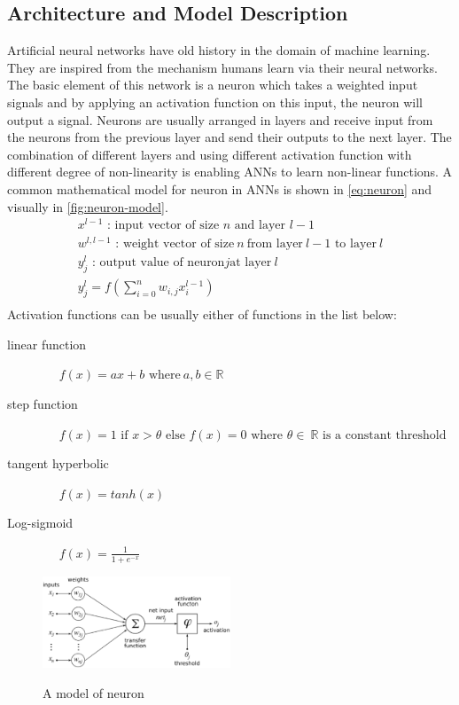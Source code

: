 \subsection{Architecture and Model Description}
\label{ssec:ml-ann-arch}
Artificial neural networks have old history in the domain of machine learning.
They are inspired from the mechanism humans learn via their neural networks. The
basic element of this network is a neuron which takes a weighted input signals and by applying an activation function
on this input, the neuron will output a signal. 
 Neurons are usually arranged in
layers and receive input from the neurons from the previous layer and send their
outputs to the next layer. The combination of different layers and using
different activation function with different degree of non-linearity is enabling
ANNs to learn non-linear functions.
A common mathematical model for neuron in ANNs is shown in
\eqref{eq:neuron} and visually in \autoref{fig:neuron-model}.
\begin{equation}
\label{eq:neuron}
\begin{split}
x^{l-1} \mbox{~: input vector of size~}n  \mbox{~and layer~}l-1
\\
w^{l,l-1} \mbox{~: weight vector of size}~n~ \text{from layer}~l-1 \text{~to
layer}~l
\\
y_{j}^{l} \mbox{~: output value of neuron}j  \mbox{at layer}~l\\
y_{j}^{l} = f(\sum_{i=0}^{n} w_{i,j}x_{i}^{l-1})\\
\end{split}
\end{equation} 
Activation functions can be
usually either of functions in the list below:
\begin{description}
\item[linear function] ~~ $f(x)=ax+b \mbox{~where}~ a,b \in \mathbb{R}$
\item[step function] ~~ $ f(x)=1 \mbox{~if~} x > \theta \mbox{~else~} f(x)=0
\mbox{~where~}\theta \in \mathbb{~R} \mbox{~is a constant threshold} $
\item[tangent hyperbolic] ~~ $f(x)=tanh(x)$
\item[Log-sigmoid] ~~ $f(x)=\frac{1}{1+e^{-x}}$
\end{description}

    \begin{figure}[h!]
  \caption{A model of neuron}
  \centering
    \includegraphics[width=0.5\textwidth]{neuron-model.eps}
    \label{fig:neuron-model}
\end{figure} 

